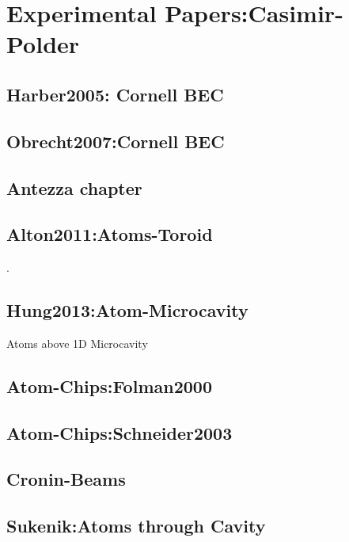 \cite{Bressi2002}

\section{Experimental Papers:Casimir-Polder}
\subsection{Harber2005: Cornell BEC}

\cite{Harber2005}
\subsection{Obrecht2007:Cornell BEC}
\cite{Obrecht2007}

\subsection{Antezza chapter}
\cite{Dalvit2011}

\subsection{Alton2011:Atoms-Toroid}

\cite{Alton2011}. 

\subsection{Hung2013:Atom-Microcavity}
 Atoms above 1D Microcavity \cite{Hung2013}


\subsection{Atom-Chips:Folman2000}

\subsection{Atom-Chips:Schneider2003}

\cite{Folman2000,Schneider2003}

\subsection{Cronin-Beams}

\cite{Perreault2005,Lonij2009}

\subsection{Sukenik:Atoms through Cavity}

